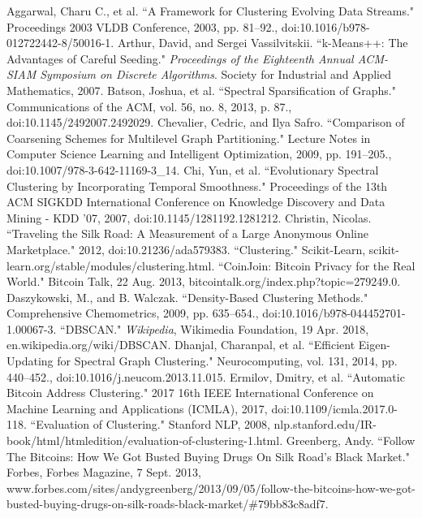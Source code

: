 \documentclass{article}
\begin{document}
\clearpage
\singlespacing
\begin{thebibliography}{1}
 Aggarwal, Charu C., et al. ``A Framework for Clustering Evolving Data Streams." Proceedings 2003 VLDB Conference, 2003, pp. 81–92., doi:10.1016/b978-012722442-8/50016-1.
 Arthur, David, and Sergei Vassilvitskii. ``k-Means++: The Advantages of Careful Seeding." \textit{Proceedings of the Eighteenth Annual ACM-SIAM Symposium on Discrete Algorithms}. Society for Industrial and Applied Mathematics, 2007. 
 Batson, Joshua, et al. ``Spectral Sparsification of Graphs." Communications of the ACM, vol. 56, no. 8, 2013, p. 87., doi:10.1145/2492007.2492029.
 Chevalier, Cedric, and Ilya Safro. ``Comparison of Coarsening Schemes for Multilevel Graph Partitioning." Lecture Notes in Computer Science Learning and Intelligent Optimization, 2009, pp. 191–205., doi:10.1007/978-3-642-11169-3\_14.
 Chi, Yun, et al. ``Evolutionary Spectral Clustering by Incorporating Temporal Smoothness." Proceedings of the 13th ACM SIGKDD International Conference on Knowledge Discovery and Data Mining - KDD '07, 2007, doi:10.1145/1281192.1281212.
 Christin, Nicolas. ``Traveling the Silk Road: A Measurement of a Large Anonymous Online Marketplace." 2012, doi:10.21236/ada579383.
 ``Clustering." Scikit-Learn, scikit-learn.org/stable/modules/clustering.html.
 ``CoinJoin: Bitcoin Privacy for the Real World." Bitcoin Talk, 22 Aug. 2013, bitcointalk.org/index.php?topic=279249.0.
 Daszykowski, M., and B. Walczak. ``Density-Based Clustering Methods." Comprehensive Chemometrics, 2009, pp. 635–654., doi:10.1016/b978-044452701-1.00067-3.
 ``DBSCAN." \textit{Wikipedia}, Wikimedia Foundation, 19 Apr. 2018, en.wikipedia.org/wiki/DBSCAN. 
 Dhanjal, Charanpal, et al. ``Efficient Eigen-Updating for Spectral Graph Clustering." Neurocomputing, vol. 131, 2014, pp. 440–452., doi:10.1016/j.neucom.2013.11.015.
 Ermilov, Dmitry, et al. ``Automatic Bitcoin Address Clustering." 2017 16th IEEE International Conference on Machine Learning and Applications (ICMLA), 2017, doi:10.1109/icmla.2017.0-118.
 ``Evaluation of Clustering." Stanford NLP, 2008, nlp.stanford.edu/IR-book/html/htmledition/evaluation-of-clustering-1.html.
 Greenberg, Andy. ``Follow The Bitcoins: How We Got Busted Buying Drugs On Silk Road's Black Market." Forbes, Forbes Magazine, 7 Sept. 2013, www.forbes.com/sites/andygreenberg/2013/09/05/follow-the-bitcoins-how-we-got-busted-buying-drugs-on-silk-roads-black-market/\#79bb83c8adf7.

\end{thebibliography}
\end{document}
